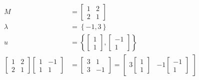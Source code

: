 \documentclass{article}
\begin{document}
\begin{equation}
    \begin{split}
        M & = \begin{bmatrix}
            1 & 2 \\ 2 & 1
        \end{bmatrix} \\
        \lambda & = \left\{ -1, 3 \right\} \\
        u & = \left\{ \begin{bmatrix}
            1 \\ 1
        \end{bmatrix},  \begin{bmatrix}
            -1 \\ 1
        \end{bmatrix} \right\} \\
        \begin{bmatrix}
            1 & 2 \\ 2 & 1
        \end{bmatrix}\begin{bmatrix}
            1 & -1 \\ 1 & 1
        \end{bmatrix} & = \begin{bmatrix}
            3 & 1 \\ 3 & -1
        \end{bmatrix} = \begin{bmatrix}
            3\begin{bmatrix}
            1 \\ 1
        \end{bmatrix} & -1\begin{bmatrix}
            -1 \\ 1
        \end{bmatrix}
        \end{bmatrix}
    \end{split}
\end{equation}
\end{document}
